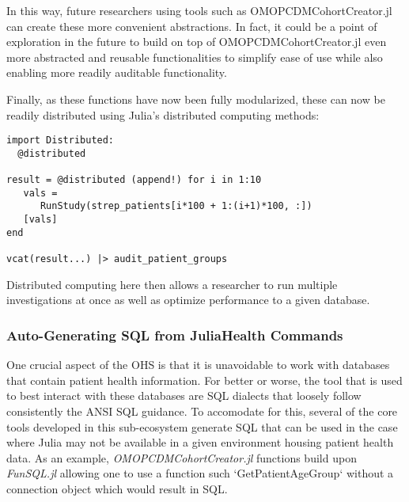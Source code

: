 \documentclass{juliacon}
\begin{document}
In this way, future researchers using tools such as OMOPCDMCohortCreator.jl can create these more convenient abstractions.
In fact, it could be a point of exploration in the future to build on top of OMOPCDMCohortCreator.jl even more abstracted and reusable functionalities to simplify ease of use while also enabling more readily auditable functionality.

Finally, as these functions have now been fully modularized, these can now be readily distributed using Julia's distributed computing methods:

\begin{listing}[!ht]
\begin{verbatim}
import Distributed:
  @distributed 

result = @distributed (append!) for i in 1:10
   vals = 
      RunStudy(strep_patients[i*100 + 1:(i+1)*100, :])
   [vals]
end

vcat(result...) |> audit_patient_groups
\end{verbatim}
\caption{}
\label{listing:}
\end{listing}

Distributed computing here then allows a researcher to run multiple investigations at once as well as optimize performance to a given database.

\subsubsection{Auto-Generating SQL from JuliaHealth Commands}

One crucial aspect of the OHS is that it is unavoidable to work with databases that contain patient health information.
For better or worse, the tool that is used to best interact with these databases are SQL dialects that loosely follow consistently the ANSI SQL guidance.
To accomodate for this, several of the core tools developed in this sub-ecosystem generate SQL that can be used in the case where Julia may not be available in a given environment housing patient health data.
As an example, \textit{OMOPCDMCohortCreator.jl} functions build upon \textit{FunSQL.jl} allowing one to use a function such `GetPatientAgeGroup` without a connection object which would result in SQL.
\end{document}
